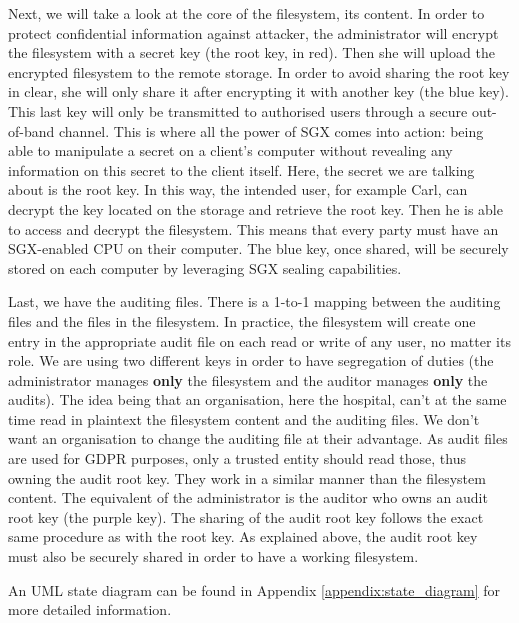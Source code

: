 \documentclass[../main.tex]{subfiles}
\begin{document}
\par Next, we will take a look at the core of the filesystem, its content. In order to protect confidential information against attacker, the administrator will encrypt the filesystem with a secret key (the root key, in red). Then she will upload the encrypted filesystem to the remote storage. In order to avoid sharing the root key in clear, she will only share it after encrypting it with another key (the blue key). This last key will only be transmitted to authorised users through a secure out-of-band channel. This is where all the power of SGX comes into action: being able to manipulate a secret on a client's computer without revealing any information on this secret to the client itself. Here, the secret we are talking about is the root key. In this way, the intended user, for example Carl, can decrypt the key located on the storage and retrieve the root key. Then he is able to access and decrypt the filesystem. This means that every party must have an SGX-enabled CPU on their computer. The blue key, once shared, will be securely stored on each computer by leveraging SGX sealing capabilities.

\par Last, we have the auditing files. There is a 1-to-1 mapping between the auditing files and the files in the filesystem. In practice, the filesystem will create one entry in the appropriate audit file on each read or write of any user, no matter its role. We are using two different keys in order to have segregation of duties (the administrator manages \textbf{only} the filesystem and the auditor manages \textbf{only} the audits). The idea being that an organisation, here the hospital, can't at the same time read in plaintext the filesystem content and the auditing files. We don't want an organisation to change the auditing file at their advantage. As audit files are used for GDPR purposes, only a trusted entity should read those, thus owning the audit root key. They work in a similar manner than the filesystem content. The equivalent of the administrator is the auditor who owns an audit root key (the purple key). The sharing of the audit root key follows the exact same procedure as with the root key. As explained above, the audit root key must also be securely shared in order to have a working filesystem.

\par An UML state diagram can be found in Appendix \ref{appendix:state_diagram} for more detailed information. %
\end{document}
